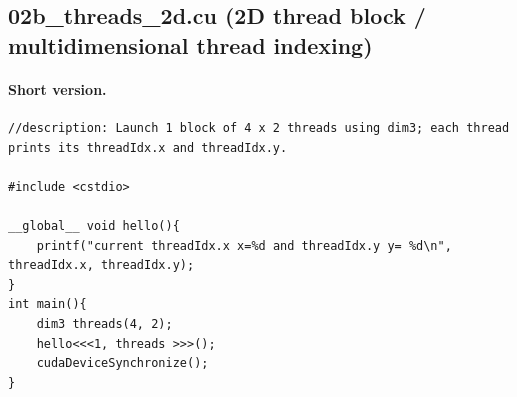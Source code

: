 \documentclass[main.tex]{subfiles}
\begin{document}
\subsection{02b\_threads\_2d.cu (2D thread block / multidimensional thread indexing)}
\paragraph{Short version.}
\begin{lstlisting}[language=CUDA]
//description: Launch 1 block of 4 x 2 threads using dim3; each thread prints its threadIdx.x and threadIdx.y.

#include <cstdio>

__global__ void hello(){
    printf("current threadIdx.x x=%d and threadIdx.y y= %d\n", threadIdx.x, threadIdx.y);
}
int main(){
    dim3 threads(4, 2);
    hello<<<1, threads >>>();
    cudaDeviceSynchronize();
}
\end{lstlisting}
\end{document}
